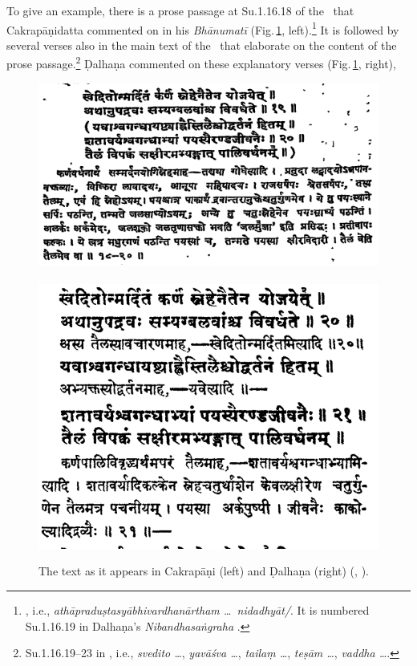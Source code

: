 To give an example, there is a prose passage at Su.1.16.18 of the \SS\ that
Cakrapāṇidatta commented on in his
\emph{Bhānumatī} (Fig.\,\ref{fig:yavasva}, left).\footnote{\cite[130]{acar-1939}, i.e.,
\emph{athāpraduṣtasyābhivardhanārtham \ldots\ nidadhyāt/}. It is numbered
Su.1.16.19 in Dalhaṇa's \emph{Nibandhasaṅgraha} \citep[79]{vulgate}.} It is
followed by several verses also in the main text  of the \SS\ that elaborate on
the content of the prose passage.\footnote{Su.1.16.19--23 in \cite{acar-1939},
i.e., \emph{svedito \ldots}, \emph{yavāśva \ldots}, \emph{tailaṃ \ldots}, \emph{teṣām
\ldots}, \emph{vaddha \ldots}.} 
%
Ḍalhaṇa commented on these explanatory verses (Fig.\,\ref{fig:yavasva}, right), 
\begin{figure}[t]
    \centering
    \includegraphics[width=.58\textwidth]{media/yavasva-cakra}\
    \includegraphics[width=.41\textwidth]{media/yavasva-dalhana}
    \caption{The text as it appears in Cakrapāṇi (left) and Ḍalhaṇa (right)  
    (\cite[130]{acar-1939}, \cite[79]{vulgate}).}
    \label{fig:yavasva}
\end{figure}
